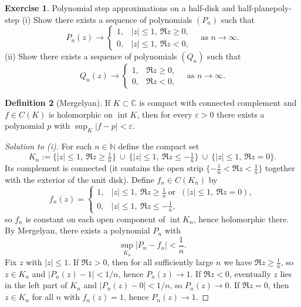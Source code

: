 \documentclass[11pt,a4paper]{article}
\theoremstyle{definition}
\newtheorem{exercise}{Exercise} %
\theoremstyle{definition}
\newtheorem{definition}[exercise]{Definition}
\theoremstyle{plain}
\theoremstyle{remark}
\begin{document}
\begin{exercise}{Polynomial step approximations on a half-disk and half-plane}{poly-step}
	(i) Show there exists a sequence of polynomials $(P_n)$ such that
	\[
	P_n(z)\longrightarrow
	\begin{cases}
		1,& |z|\le1,\ \Re z\ge0,\\
		0,& |z|\le1,\ \Re z<0,
	\end{cases}
	\quad\text{as }n\to\infty.
	\]
	(ii) Show there exists a sequence of polynomials $(Q_n)$ such that
	\[
	Q_n(z)\longrightarrow
	\begin{cases}
		1,& \Re z\ge0,\\
		0,& \Re z<0,
	\end{cases}
	\quad\text{as }n\to\infty.
	\]
\end{exercise}

\begin{definition}[Mergelyan]
	If $K\subset\mathbb C$ is compact with connected complement and $f\in C(K)$ is
	holomorphic on $\operatorname{int}K$, then for every $\varepsilon>0$ there exists a polynomial $p$
	with $\sup_{K}|f-p|<\varepsilon$.
\end{definition}

\begin{proof}[Solution to (i)]
	For each $n\in\mathbb N$ define the compact set
	\[
	K_n:=\bigl\{|z|\le1,\ \Re z\ge \tfrac1n\bigr\}\ \cup\
	\bigl\{|z|\le1,\ \Re z\le -\tfrac1n\bigr\}\ \cup\
	\bigl\{|z|\le1,\ \Re z=0\bigr\}.
	\]
	Its complement is connected (it contains the open strip $\{-\tfrac1n<\Re z<\tfrac1n\}$ together with the exterior of the unit disk).
	Define $f_n\in C(K_n)$ by
	\[
	f_n(z)=
	\begin{cases}
		1,& |z|\le1,\ \Re z\ge \tfrac1n\ \text{or }\ (|z|\le1,\ \Re z=0),\\
		0,& |z|\le1,\ \Re z\le -\tfrac1n,
	\end{cases}
	\]
	so $f_n$ is constant on each open component of $\operatorname{int}K_n$, hence holomorphic there.
	By Mergelyan, there exists a polynomial $P_n$ with
	\[
	\sup_{K_n}|P_n-f_n|<\frac1n.
	\]
	Fix $z$ with $|z|\le1$. If $\Re z>0$, then for all sufficiently large $n$ we have $\Re z\ge \tfrac1n$,
	so $z\in K_n$ and $|P_n(z)-1|<1/n$, hence $P_n(z)\to1$. If $\Re z<0$, eventually $z$ lies in the left part of $K_n$ and $|P_n(z)-0|<1/n$, so $P_n(z)\to0$. If $\Re z=0$, then $z\in K_n$ for all $n$ with $f_n(z)=1$, hence $P_n(z)\to1$.
\end{proof}
\end{document}
